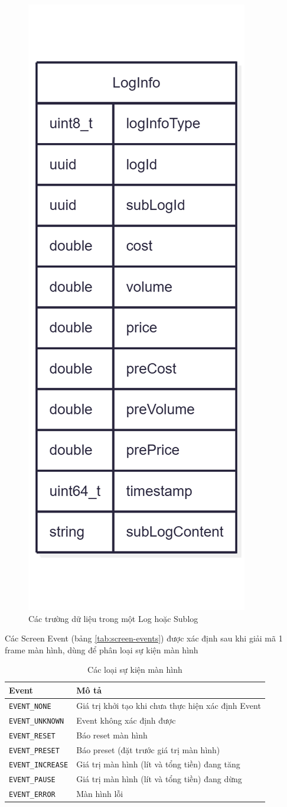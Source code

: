 \begin{figure}[!ht]
     \centering
    \includegraphics[width=0.4\linewidth]{Figures/DeviceService_log-info-entity.png}
    \caption{Các trường dữ liệu trong một Log hoặc Sublog}
    \label{fig:Các trường dữ liệu trong một Log hoặc Sublog}
\end{figure}



Các Screen Event (bảng \ref{tab:screen-events}) được xác định sau khi giải mã 1 frame màn hình, dùng để phân loại sự kiện màn hình

\begin{table}[H]
\centering
\begin{tabular}{|l|p{10cm}|}
\hline
\textbf{Event} & \textbf{Mô tả} \\
\hline
\texttt{EVENT\_NONE} & Giá trị khởi tạo khi chưa thực hiện xác định Event \\
\hline
\texttt{EVENT\_UNKNOWN} & Event không xác định được \\
\hline
\texttt{EVENT\_RESET} & Báo reset màn hình \\
\hline
\texttt{EVENT\_PRESET} & Báo preset (đặt trước giá trị màn hình) \\
\hline
\texttt{EVENT\_INCREASE} & Giá trị màn hình (lít và tổng tiền) đang tăng \\
\hline
\texttt{EVENT\_PAUSE} & Giá trị màn hình (lít và tổng tiền) đang dừng \\
\hline
\texttt{EVENT\_ERROR} & Màn hình lỗi \\
\hline
\end{tabular}
\caption{Các loại sự kiện màn hình}
\end{table}


